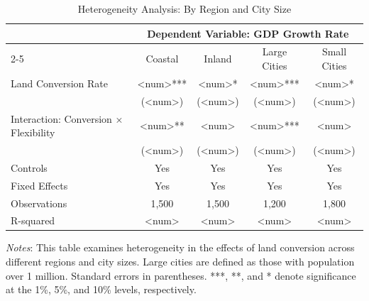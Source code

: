 \begin{table}[ht]
\centering
\caption{Heterogeneity Analysis: By Region and City Size}
\label{tab:heterogeneity}
\begin{tabular}{lcccc}
\toprule
 & \multicolumn{4}{c}{Dependent Variable: GDP Growth Rate} \\
\cmidrule(lr){2-5}
 & Coastal & Inland & Large Cities & Small Cities \\
\midrule
Land Conversion Rate & <num>*** & <num>* & <num>*** & <num>* \\
 & (<num>) & (<num>) & (<num>) & (<num>) \\
Interaction: Conversion × Flexibility & <num>** & <num> & <num>*** & <num> \\
 & (<num>) & (<num>) & (<num>) & (<num>) \\
\midrule
Controls & Yes & Yes & Yes & Yes \\
Fixed Effects & Yes & Yes & Yes & Yes \\
Observations & 1,500 & 1,500 & 1,200 & 1,800 \\
R-squared & <num> & <num> & <num> & <num> \\
\bottomrule
\end{tabular}
\begin{tablenotes}
\small
\item \textit{Notes}: This table examines heterogeneity in the effects of land conversion across different regions and city sizes. Large cities are defined as those with population over 1 million. Standard errors in parentheses. ***, **, and * denote significance at the 1\%, 5\%, and 10\% levels, respectively.
\end{tablenotes}
\end{table}


